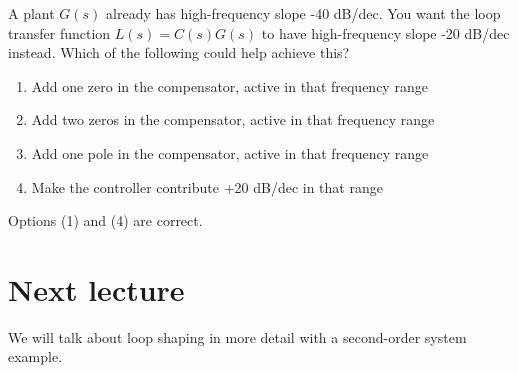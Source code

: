 \documentclass{ee122_notes}
\begin{document}
\begin{popquiz}
A plant $G(s)$ already has high-frequency slope -40 dB/dec. You want the loop transfer function $L(s)=C(s)G (s)$ to have high-frequency slope -20 dB/dec instead. Which of the following could help achieve this?
\begin{enumerate}
\item Add one zero in the compensator, active in that frequency range

\item Add two zeros in the compensator, active in that frequency range

\item Add one pole in the compensator, active in that frequency range

\item Make the controller contribute +20 dB/dec in that range
\end{enumerate}
\popqsplit 
Options (1) and (4) are correct.
\end{popquiz}
\section{Next lecture}
We will talk about loop shaping in more detail with a second-order system example.
\end{document}
